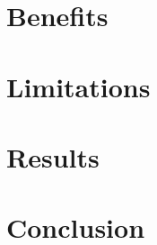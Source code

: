 \documentclass{article}
\begin{document}
\section{Benefits}

\section{Limitations}

\section{Results}

\section{Conclusion}



\end{document}
